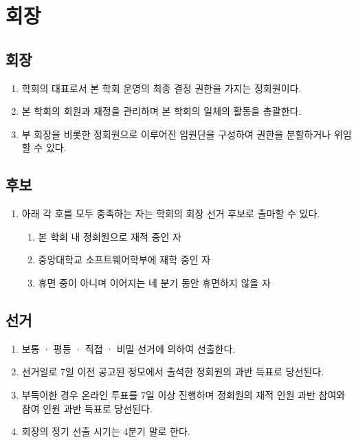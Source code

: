 \documentclass{oblivoir}
\begin{document}
\chapter{회장}

\section{회장}
\begin{enumerate}
    \item  학회의 대표로서 본 학회 운영의 최종 결정 권한을 가지는 정회원이다.
    \item  본 학회의 회원과 재정을 관리하며 본 학회의 일체의 활동을 총괄한다.
    \item  부 회장을 비롯한 정회원으로 이루어진 임원단을 구성하여 권한을 분할하거나 위임할
          수 있다.
\end{enumerate}

\section{후보}
\begin{enumerate}
    \item  아래 각 호를 모두 충족하는 자는 학회의 회장 선거 후보로 출마할 수 있다.
    \begin{enumerate}
        \item 본 학회 내 정회원으로 재적 중인 자
        \item 중앙대학교 소프트웨어학부에 재학 중인 자
        \item 휴면 중이 아니며 이어지는 네 분기 동안 휴면하지 않을 자
    \end{enumerate}
\end{enumerate}

\section{선거}
\begin{enumerate}
    \item  보통 · 평등 · 직접 · 비밀 선거에 의하여 선출한다.
    \item  선거일로 7일 이전 공고된 정모에서 출석한 정회원의 과반 득표로 당선된다.
    \item  부득이한 경우 온라인 투표를 7일 이상 진행하며 정회원의 재적 인원 과반 참여와 참여
          인원 과반 득표로 당선된다.
    \item  회장의 정기 선출 시기는 4분기 말로 한다.
\end{enumerate}
\end{document}
